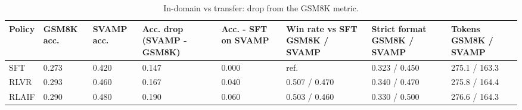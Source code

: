\begin{table}[t]
\centering
\small
\caption{In-domain vs transfer: drop from the GSM8K metric.}
\begin{tabular}{llllllll}
\toprule
Policy & GSM8K acc. & SVAMP acc. & Acc. drop (SVAMP - GSM8K) & Acc. - SFT on SVAMP & Win rate vs SFT GSM8K / SVAMP & Strict format GSM8K / SVAMP & Tokens GSM8K / SVAMP \\
\midrule
SFT & 0.273 & 0.420 & 0.147 & 0.000 & ref. & 0.323 / 0.450 & 275.1 / 163.3 \\
RLVR & 0.293 & 0.460 & 0.167 & 0.040 & 0.507 / 0.470 & 0.340 / 0.470 & 275.8 / 164.4 \\
RLAIF & 0.290 & 0.480 & 0.190 & 0.060 & 0.503 / 0.460 & 0.330 / 0.500 & 276.6 / 164.3 \\
\bottomrule
\end{tabular}
\end{table}
